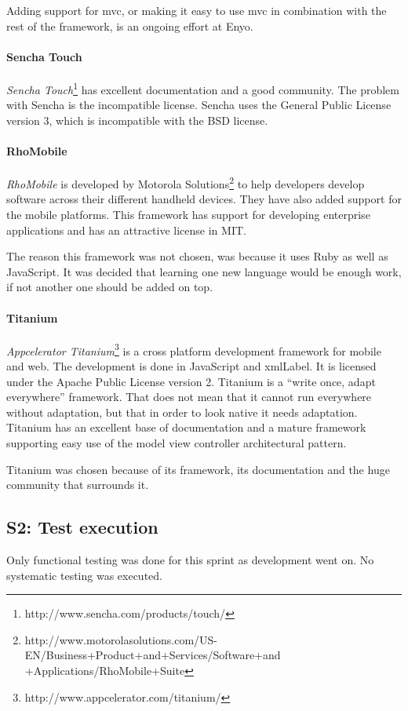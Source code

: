 \documentclass[11pt]{book}
\begin{document}
Adding support for \gls{mvc}, or making it easy to use \gls{mvc} in combination with the rest of the framework, is an ongoing effort at Enyo.

\paragraph{Sencha Touch}
\emph{Sencha Touch}\footnote{http://www.sencha.com/products/touch/} has excellent documentation and a good community. The problem with Sencha is the incompatible license. Sencha uses the General Public License version 3, which is incompatible with the BSD license.\cite{flossLicense}

\paragraph{RhoMobile}
\emph{RhoMobile} is developed by Motorola Solutions\footnote{http://www.motorolasolutions.com/US-EN/Business+Product+and+Services/Software+and\\+Applications/RhoMobile+Suite} to help developers develop software across their different handheld devices. They have also added support for the mobile platforms. This framework has support for developing enterprise applications and has an attractive license in MIT.

The reason this framework was not chosen, was because it uses Ruby as well as JavaScript. It was decided that learning one new language would be enough work, if not another one should be added on top.

\paragraph{Titanium}
\emph{Appcelerator Titanium}\footnote{http://www.appcelerator.com/titanium/} is a cross platform development framework for mobile and web. The development is done in JavaScript and \gls{xmlLabel}. It is licensed under the Apache Public License version 2. Titanium is a ``write once, adapt everywhere'' framework.\cite{titaniumCrossMobile} That does not mean that it cannot run everywhere without adaptation, but that in order to look native it needs adaptation. Titanium has an excellent base of documentation and a mature framework supporting easy use of the model view controller architectural pattern.

Titanium was chosen because of its framework, its documentation and the huge community that surrounds it.


\subsection{S2: Test execution}
Only functional testing was done for this sprint as development went on. No systematic testing was executed.
\end{document}
